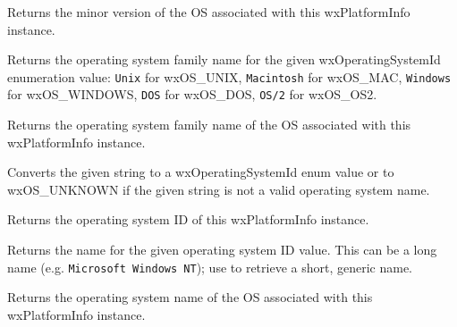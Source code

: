 Returns the minor version of the OS associated with this wxPlatformInfo instance.




\label{wxplatforminfogetoperatingsystemfamilyname}


Returns the operating system family name for the given wxOperatingSystemId enumeration value:
{\tt Unix} for wxOS_UNIX, {\tt Macintosh} for wxOS_MAC, {\tt Windows} for wxOS_WINDOWS,
{\tt DOS} for wxOS_DOS, {\tt OS/2} for wxOS_OS2.


Returns the operating system family name of the OS associated with this wxPlatformInfo instance.



\label{wxplatforminfogetoperatingsystemid}


Converts the given string to a wxOperatingSystemId enum value or to
wxOS_UNKNOWN if the given string is not a valid operating system name.


Returns the operating system ID of this wxPlatformInfo instance.



\label{wxplatforminfogetoperatingsystemidname}


Returns the name for the given operating system ID value. This can be a long name
(e.g. {\tt Microsoft Windows NT}); use  to
retrieve a short, generic name.



Returns the operating system name of the OS associated with this wxPlatformInfo instance.





\label{wxplatforminfogetportid}

